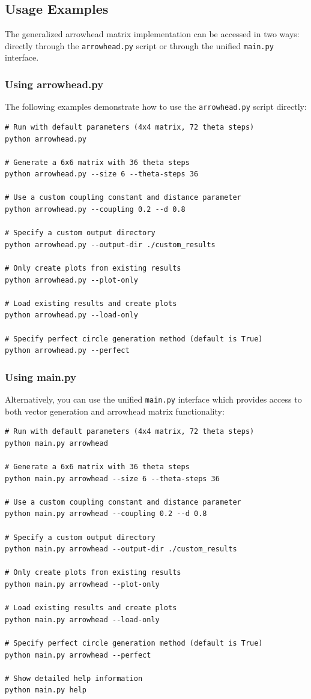 \subsection{Usage Examples}

The generalized arrowhead matrix implementation can be accessed in two ways: directly through the \texttt{arrowhead.py} script or through the unified \texttt{main.py} interface.

\subsubsection{Using arrowhead.py}

The following examples demonstrate how to use the \texttt{arrowhead.py} script directly:

\begin{verbatim}
# Run with default parameters (4x4 matrix, 72 theta steps)
python arrowhead.py

# Generate a 6x6 matrix with 36 theta steps
python arrowhead.py --size 6 --theta-steps 36

# Use a custom coupling constant and distance parameter
python arrowhead.py --coupling 0.2 --d 0.8

# Specify a custom output directory
python arrowhead.py --output-dir ./custom_results

# Only create plots from existing results
python arrowhead.py --plot-only

# Load existing results and create plots
python arrowhead.py --load-only

# Specify perfect circle generation method (default is True)
python arrowhead.py --perfect
\end{verbatim}

\subsubsection{Using main.py}

Alternatively, you can use the unified \texttt{main.py} interface which provides access to both vector generation and arrowhead matrix functionality:

\begin{verbatim}
# Run with default parameters (4x4 matrix, 72 theta steps)
python main.py arrowhead

# Generate a 6x6 matrix with 36 theta steps
python main.py arrowhead --size 6 --theta-steps 36

# Use a custom coupling constant and distance parameter
python main.py arrowhead --coupling 0.2 --d 0.8

# Specify a custom output directory
python main.py arrowhead --output-dir ./custom_results

# Only create plots from existing results
python main.py arrowhead --plot-only

# Load existing results and create plots
python main.py arrowhead --load-only

# Specify perfect circle generation method (default is True)
python main.py arrowhead --perfect

# Show detailed help information
python main.py help
\end{verbatim}

